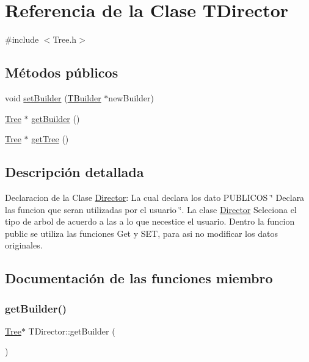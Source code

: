 \hypertarget{class_t_director}{}\section{Referencia de la Clase T\+Director}
\label{class_t_director}


{\ttfamily \#include $<$Tree.\+h$>$}

\subsection*{Métodos públicos}
\begin{DoxyCompactItemize}
\item 
void \mbox{\hyperlink{class_t_director_a9dc2e7bc1a9fa5d9033ee4cc48c7ac3f}{set\+Builder}} (\mbox{\hyperlink{class_t_builder}{T\+Builder}} $\ast$new\+Builder)
\item 
\mbox{\hyperlink{class_tree}{Tree}} $\ast$ \mbox{\hyperlink{class_t_director_aa2e7638eb6a1ba5977a5a1449d318496}{get\+Builder}} ()
\item 
\mbox{\hyperlink{class_tree}{Tree}} $\ast$ \mbox{\hyperlink{class_t_director_aca5fe67cd7f33ebb8edc9c1e10ef7316}{get\+Tree}} ()
\end{DoxyCompactItemize}


\subsection{Descripción detallada}
Declaracion de la Clase \mbox{\hyperlink{class_director}{Director}}\+: La cual declara los dato P\+U\+B\+L\+I\+C\+OS \char`\"{} Declara las funcion que seran utilizadas por el usuario \char`\"{}. La clase \mbox{\hyperlink{class_director}{Director}} Seleciona el tipo de arbol de acuerdo a las a lo que necestice el usuario. Dentro la funcion public se utiliza las funciones Get y S\+ET, para asi no modificar los datos originales. 

\subsection{Documentación de las funciones miembro}
\mbox{\label{class_t_director_aa2e7638eb6a1ba5977a5a1449d318496}} 
\subsubsection{\texorpdfstring{getBuilder()}{getBuilder()}}
{\footnotesize\ttfamily \mbox{\hyperlink{class_tree}{Tree}}$\ast$ T\+Director\+::get\+Builder (\begin{DoxyParamCaption}{ }\end{DoxyParamCaption})\hspace{0.3cm}{\ttfamily [inline]}}

